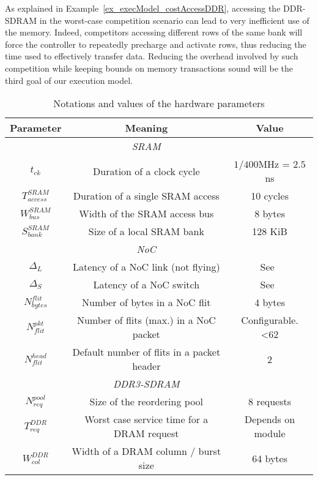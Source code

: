 \documentclass[main.tex]{subfiles}
\begin{document}
As explained in Example~\ref{ex_execModel_costAccessDDR}, accessing the DDR-SDRAM in the worst-case competition scenario can lead to very inefficient use of the memory. Indeed, competitors accessing different rows of the same bank will force the controller to repeatedly precharge and activate rows, thus reducing the time used to effectively transfer data. Reducing the overhead involved by such competition while keeping bounds on memory transactions sound will be the third goal of our execution model.


\begin{table}
\begin{center}
    \begin{tabular*}{0.95\linewidth}{@{\extracolsep{\fill}} c c c}
	\hline
        {\sc \textbf{Parameter}} 	& {\sc \textbf{Meaning}} & \textbf{\sc \textbf{Value}} 	\\
	    \hline
         & \emph{SRAM} & \\
        \hline
        $t_{ck}$ & Duration of a clock cycle & $1 / 400$MHz = $2.5$ns \\
        $T_{access}^{SRAM}$ & Duration of a single SRAM access & 10 cycles \\
        $W_{bus}^{SRAM}$ & Width of the SRAM access bus & 8 bytes \\
        $S_{bank}^{SRAM}$ & Size of a local SRAM bank & 128 KiB \\
	    \hline
         & \emph{NoC} & \\
        \hline
        $\Delta_L$ & Latency of a NoC link (not flying) &  See~\cite{kalray_mppa}\\
        $\Delta_S$ & Latency of a NoC switch & See~\cite{kalray_mppa}\\
        $N_{bytes}^{flit}$ & Number of bytes in a NoC flit & 4 bytes \\
        $N_{flit}^{pkt}$ & Number of flits (max.) in a NoC packet & Configurable. <62 \\
        $N_{flit}^{head}$ & Default number of flits in a packet header & 2 \\
	    \hline
         & \emph{DDR3-SDRAM} & \\
        \hline
        $N_{req}^{pool}$ & Size of the reordering pool & 8 requests \\
        $T_{req}^{DDR}$ & Worst case service time for a DRAM request &  Depends on module \\
        $W_{col}^{DDR}$ & Width of a DRAM column / burst size & 64 bytes \\
        \hline	
\end{tabular*}
\end{center}
\caption{Notations and values of the \mppalong hardware parameters}
\label{table_execModel_MPPAhwParams}
\end{table}
\end{document}
